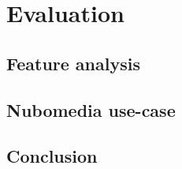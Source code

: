 \chapter{Evaluation}

\section{Feature analysis}

\section{Nubomedia use-case}

\section{Conclusion}